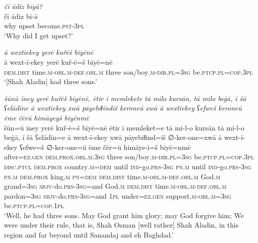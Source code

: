 \ea \label{PM.50}
\textit{čī ādiz bīyā?} \\ 
\gll čī ādiz bī-ā \\ 
 why upset become\textsc{.pst}\textsc{-3pl} \\ 
\glt `Why did I get upset?'
\z 
 
\ea \label{DG.3}
\textit{ā wextīekey yerē kuřēš bīyēnē} \\ 
\gll ā wext-ī-ekey yerē kuř-ē=š bīyē=nē \\ 
 \textsc{dem.dist} time\textsc{.m}\textsc{-obl}\textsc{.m}\textsc{-def}\textsc{.obl}\textsc{.m} three son/boy\textsc{.m}\textsc{-dir}\textsc{.pl}\textsc{=3sg} be\textsc{.ptcp}\textsc{.pl}\textsc{=cop}\textsc{.3pl} \\ 
\glt `[Shah Aladin] had three sons.'
\z 
 
\ea \label{DG.4}
\textit{šūnū īney yerē kuřēš bīyēnē, ētir ī memlekete tā milo kursān, tā milo beġā, ī šā ʕelādīne ā wextīekey xwā pāyebiɫindiš keroneū xwā ā wextīekey ʕefweš keroneū ēme čērū himāyeyš bīyēnmē} \\ 
\gll šūn=ū īney yerē kuř-ē=š bīyē=nē ētir ī memleket=e tā mi-l-o kursān tā mi-l-o beġā, ī šā ʕelādīn=e ā wext-ī-ekey xwā pāyebiɫind=iš ∅-ker-one=xwā ā wext-ī-ekey ʕefwe=š ∅-ker-one=ū ēme čēr=ū himāye-ī=š bīyē=nmē \\ 
 after\textsc{=ez}\textsc{.gen} \textsc{dem.prox}\textsc{.obl}\textsc{.m}\textsc{.3sg} three son/boy\textsc{.m}\textsc{-dir}\textsc{.pl}\textsc{=3sg} be\textsc{.ptcp}\textsc{.pl}\textsc{=cop}\textsc{.3pl} \textsc{disc.ptcl} \textsc{dem.prox} country\textsc{.m}\textsc{=dem} until \textsc{ind-}go\textsc{.prs}\textsc{-3sg} \textsc{pn}\textsc{.m} until \textsc{ind-}go\textsc{.prs}\textsc{-3sg} \textsc{pn}\textsc{.m} \textsc{dem.prox} king\textsc{.m} \textsc{pn}\textsc{=dem} \textsc{dem.dist} time\textsc{.m}\textsc{-obl}\textsc{.m}\textsc{-def}\textsc{.obl}\textsc{.m} God\textsc{.m} grand\textsc{=3sg} \textsc{sbjv-}do\textsc{.prs}\textsc{-3sg}=and God\textsc{.m} \textsc{dem.dist} time\textsc{.m}\textsc{-obl}\textsc{.m}\textsc{-def}\textsc{.obl}\textsc{.m} pardon\textsc{=3sg} \textsc{sbjv-}do\textsc{.prs}\textsc{-3sg}=and \textsc{1pl} under\textsc{=ez}\textsc{.gen} support\textsc{.m}\textsc{-obl}\textsc{.m}\textsc{=3sg} be\textsc{.ptcp}\textsc{.pl}\textsc{=cop}\textsc{.1pl} \\ 
\glt `Well, he had three sons. May God grant him glory; may God forgive him; We were under their rule, that is, Shah Osman [well rather] Shah Aladin, in this region and far beyond until Sanandaj and eh Baghdad.'
\z 
 
